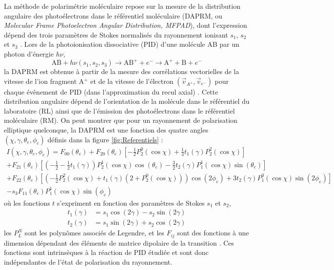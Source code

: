 La méthode de polarimétrie moléculaire repose sur la mesure de la distribution angulaire des photoélectrons dans le référentiel moléculaire (DAPRM, ou \textit{Molecular Frame Photoelectron Angular Distribution, MFPAD}), dont l'expression dépend des trois paramètres de Stokes normalisés du rayonnement ionisant $s_1$, $s_2$ et $s_3$ . Lors de la photoionisation dissociative (PID) d'une molécule AB par un photon d'énergie $h \nu$,
\begin{equation}
\text{AB} + h \nu (s_1, s_2, s_3) \longrightarrow \text{AB}^+ + e^- \longrightarrow \text{A}^+ + \text{B} + e^- 
\end{equation}
la DAPRM est obtenue à partir de la mesure des corrélations vectorielles de la vitesse de l'ion fragment A$^+$ et de la vitesse de l'électron $(\vec{v}_{A^+}, \vec{v}_{e^-})$ pour chaque évènement de PID (dans l'approximation du recul axial) . Cette distribution angulaire dépend de l'orientation de la molécule dans le référentiel du laboratoire (RL) ainsi que de l'émission des photoélectrons dans le référentiel moléculaire (RM). On peut montrer que pour un rayonnement de polarisation elliptique quelconque, la DAPRM est une fonction des quatre angles $(\chi, \gamma, \theta_e, \phi_e)$ définis dans la figure \ref{fig:Referentiels} :
\begin{multline}
I(\chi, \gamma, \theta_e, \phi_e) = F_{00}(\theta_e) + F_{20}(\theta_e) \left[ - \frac{1}{2} P_2^0(\cos \chi) + \frac{1}{4} t_1(\gamma) P_2^2(\cos \chi) \right] \\
+ F_{21}(\theta_e) \left[ \left(-\frac{1}{2}-\frac{1}{2} t_1 (\gamma) \right) P_2^1(\cos \chi) \cos(\theta_e) - \frac{3}{2} t_2(\gamma) P_1^1(\cos \chi) \sin(\theta_e) \right] \\
+ F_{22}(\theta_e) \left[ \left( -\frac{1}{2} P_2^2(\cos \chi) + t_1(\gamma)(2 + P_2^0 (\cos \chi)) \right) \cos (2 \phi_e) + 3 t_2(\gamma) P_1^0 (\cos \chi) \sin(2 \phi_e) \right] \\
-s_3 F_{11}(\theta_e) P_1^1(\cos \chi) \sin(\phi_e)
\label{eq:MFPAD}
\end{multline}
où les fonctions $t$ s'expriment en fonction des paramètres de Stokes $s_1$ et $s_2$,
\begin{align}
t_1(\gamma) & = s_1 \cos(2\gamma) - s_2 \sin(2\gamma)\\
t_2(\gamma) & = s_1 \sin(2\gamma) + s_2 \cos(2\gamma)
\end{align}
les $P_L^N$ sont les polynômes associés de Legendre, et les $F_{ij}$ sont des fonctions à une dimension dépendant des éléments de matrice dipolaire de la transition . Ces fonctions sont intrinsèques à la réaction de PID étudiée et sont donc indépendantes de l'état de polarisation du rayonnement.

